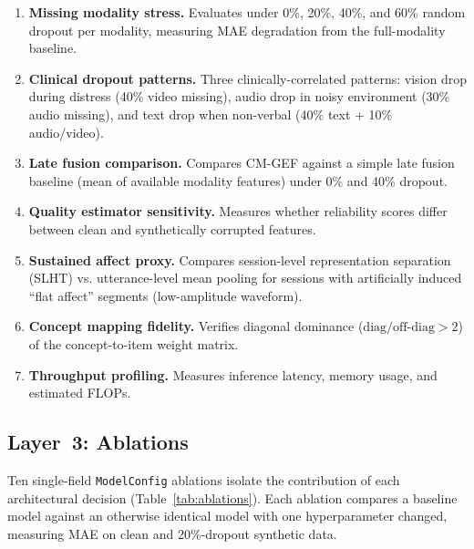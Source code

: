 \documentclass{article}
\begin{document}
\begin{enumerate}
  \item \textbf{Missing modality stress.} Evaluates under 0\%, 20\%, 40\%, and 60\%
        random dropout per modality, measuring MAE degradation from the full-modality
        baseline.
  \item \textbf{Clinical dropout patterns.} Three clinically-correlated patterns: vision
        drop during distress (40\% video missing), audio drop in noisy environment (30\%
        audio missing), and text drop when non-verbal (40\% text + 10\% audio/video).
  \item \textbf{Late fusion comparison.} Compares CM-GEF against a simple late fusion
        baseline (mean of available modality features) under 0\% and 40\% dropout.
  \item \textbf{Quality estimator sensitivity.} Measures whether reliability scores
        differ between clean and synthetically corrupted features.
  \item \textbf{Sustained affect proxy.} Compares session-level representation separation
        (SLHT) vs. utterance-level mean pooling for sessions with artificially induced
        ``flat affect'' segments (low-amplitude waveform).
  \item \textbf{Concept mapping fidelity.} Verifies diagonal dominance
        ($\text{diag}/\text{off-diag} > 2$) of the concept-to-item weight matrix.
  \item \textbf{Throughput profiling.} Measures inference latency, memory usage, and
        estimated FLOPs.
\end{enumerate}

\subsection{Layer~3: Ablations}

Ten single-field \texttt{ModelConfig} ablations isolate the contribution of each
architectural decision (Table~\ref{tab:ablations}). Each ablation compares a baseline
model against an otherwise identical model with one hyperparameter changed, measuring
MAE on clean and 20\%-dropout synthetic data.
\end{document}
